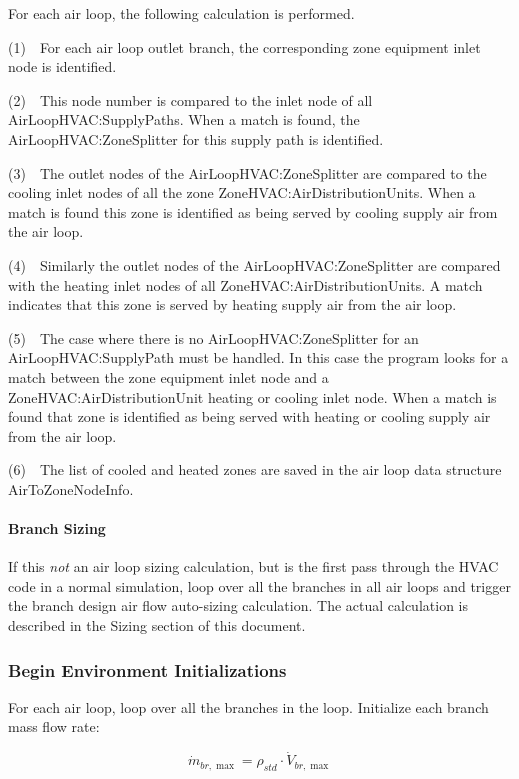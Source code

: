 For each air loop, the following calculation is performed.

(1)~~For each air loop outlet branch, the corresponding zone equipment inlet node is identified.

(2)~~This node number is compared to the inlet node of all AirLoopHVAC:SupplyPaths. When a match is found, the AirLoopHVAC:ZoneSplitter for this supply path is identified.

(3)~~The outlet nodes of the AirLoopHVAC:ZoneSplitter are compared to the cooling inlet nodes of all the zone ZoneHVAC:AirDistributionUnits. When a match is found this zone is identified as being served by cooling supply air from the air loop.

(4)~~Similarly the outlet nodes of the AirLoopHVAC:ZoneSplitter are compared with the heating inlet nodes of all ZoneHVAC:AirDistributionUnits. A match indicates that this zone is served by heating supply air from the air loop.

(5)~~The case where there is no AirLoopHVAC:ZoneSplitter for an AirLoopHVAC:SupplyPath must be handled. In this case the program looks for a match between the zone equipment inlet node and a ZoneHVAC:AirDistributionUnit heating or cooling inlet node. When a match is found that zone is identified as being served with heating or cooling supply air from the air loop.

(6)~~The list of cooled and heated zones are saved in the air loop data structure AirToZoneNodeInfo.

\paragraph{Branch Sizing}\label{branch-sizing}

If this \emph{not} an air loop sizing calculation, but is the first pass through the HVAC code in a normal simulation, loop over all the branches in all air loops and trigger the branch design air flow auto-sizing calculation. The actual calculation is described in the Sizing section of this document.

\subsubsection{Begin Environment Initializations}\label{begin-environment-initializations}

For each air loop, loop over all the branches in the loop. Initialize each branch mass flow rate:

\begin{equation}
{\dot m_{br,\max }} = {\rho_{std}} \cdot {\dot V_{br,\max }}
\end{equation}

